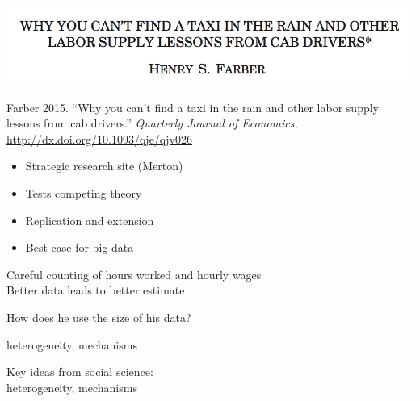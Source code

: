 \documentclass[aspectratio=169]{beamer}
\def\vf{\vfill}
\begin{document}
\begin{frame}

\begin{center}
\includegraphics[width=\textwidth]{figures/farber_why_2015_title}
\end{center}

\vf
Farber 2015. ``Why you can't find a taxi in the rain and other labor supply lessons from cab drivers.'' \textit{Quarterly Journal of Economics}, \url{http://dx.doi.org/10.1093/qje/qjv026}

\end{frame}
\begin{frame}

\begin{itemize}
\item Strategic research site (Merton)
\pause
\item Tests competing theory
\pause
\item Replication and extension
\pause
\item Best-case for big data
\end{itemize}

\end{frame}
\begin{frame}

Careful counting of hours worked and hourly wages\\
Better data leads to better estimate

\end{frame}
\begin{frame}

{\Large
\begin{center}
How does he use the size of his data?
\end{center}
}
\pause
heterogeneity, mechanisms

\end{frame}
\begin{frame}

{\Large
\begin{center}
Key ideas from social science:\\
heterogeneity, mechanisms
\end{center}
}

\end{frame}
\end{document}
